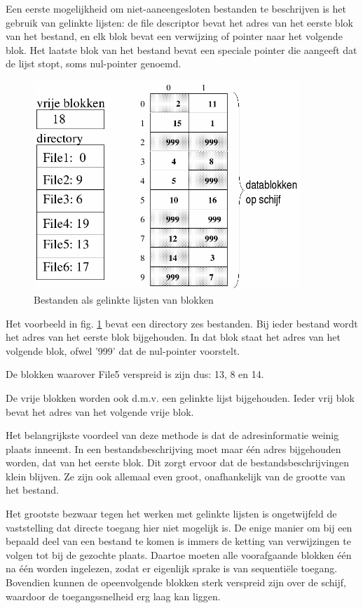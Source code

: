 Een eerste mogelijkheid om niet-aaneengesloten bestanden te
beschrijven is het gebruik van gelinkte lijsten: de file descriptor
bevat het adres van het eerste blok van het bestand, en elk blok bevat
een verwijzing of pointer naar het volgende blok. Het laatste blok van
het bestand bevat een speciale pointer die aangeeft dat de lijst
stopt, soms nul-pointer genoemd.

\begin{figure}
\begin{center}
\includegraphics[width=100mm]{images/fig0408.png}
\caption{Bestanden als gelinkte lijsten van blokken}
\end{center}
\label{linklijst}
\end{figure}

Het voorbeeld in fig. \ref{linklijst} bevat een directory zes bestanden. Bij ieder
bestand wordt het adres van het eerste blok bijgehouden. In dat blok
staat het adres van het volgende blok, ofwel '999' dat de nul-pointer
voorstelt.

De blokken waarover File5 verspreid is zijn dus: 13, 8 en
14.

De vrije blokken worden ook d.m.v. een gelinkte lijst
bijgehouden. Ieder vrij blok bevat het adres van het volgende vrije
blok.

Het belangrijkste voordeel van deze methode is dat de
adresinformatie weinig plaats inneemt. In een bestandsbeschrijving
moet maar \'e\'en adres bijgehouden worden, dat van het eerste blok. Dit
zorgt ervoor dat de bestandsbeschrijvingen klein blijven. Ze zijn ook
allemaal even groot, onafhankelijk van de grootte van het
bestand.

Het grootste bezwaar tegen het werken met gelinkte lijsten is
ongetwijfeld de vaststelling dat directe toegang hier niet mogelijk
is. De enige manier om bij een bepaald deel van een bestand te komen
is immers de ketting van verwijzingen te volgen tot bij de gezochte
plaats. Daartoe moeten alle voorafgaande blokken \'e\'en na \'e\'en worden
ingelezen, zodat er eigenlijk sprake is van sequenti\"ele toegang.
Bovendien kunnen de opeenvolgende blokken sterk verspreid zijn over de
schijf, waardoor de toegangssnelheid erg laag kan liggen.

